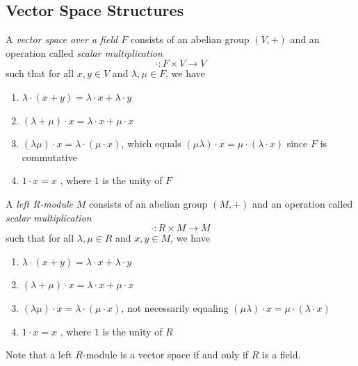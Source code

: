 \documentclass{article}
\begin{document}
  \subsection{Vector Space Structures}

    \begin{definition}
       A \textit{vector space over a field $F$} consists of an abelian group $(V, +)$ and an operation called \textit{scalar multiplication} 
       \begin{equation}
         \cdot: F \times V \rightarrow V
       \end{equation}
      such that for all $x, y\in V$ and $\lambda, \mu \in F$, we have 
      \begin{enumerate}
        \item $\lambda \cdot (x + y) = \lambda \cdot x + \lambda \cdot y$
        \item $(\lambda + \mu) \cdot x = \lambda \cdot x + \mu \cdot x$ 
        \item $(\lambda \mu) \cdot x = \lambda \cdot (\mu \cdot x )$, which equals $(\mu \lambda) \cdot x = \mu \cdot (\lambda \cdot x)$ since $F$ is commutative 
        \item $1 \cdot x = x$ , where $1$ is the unity of $F$
      \end{enumerate}
    \end{definition}

    \begin{definition}
      A \textit{left R-module} $M$ consists of an abelian group $(M, +)$ and an operation called \textit{scalar multiplication}
      \begin{equation}
        \cdot: R \times M \longrightarrow M
      \end{equation}
      such that for all $\lambda, \mu \in R$ and $x, y \in M$, we have 
      \begin{enumerate}
        \item $\lambda \cdot (x + y) = \lambda \cdot x + \lambda \cdot y$
        \item $(\lambda + \mu) \cdot x = \lambda \cdot x + \mu \cdot x$ 
        \item $(\lambda \mu) \cdot x = \lambda \cdot (\mu \cdot x )$, not necessarily equaling $(\mu \lambda) \cdot x = \mu \cdot (\lambda \cdot x)$
        \item $1 \cdot x = x$ , where $1$ is the unity of $R$
      \end{enumerate}
      Note that a left $R$-module is a vector space if and only if $R$ is a field.
    \end{definition}
\end{document}
